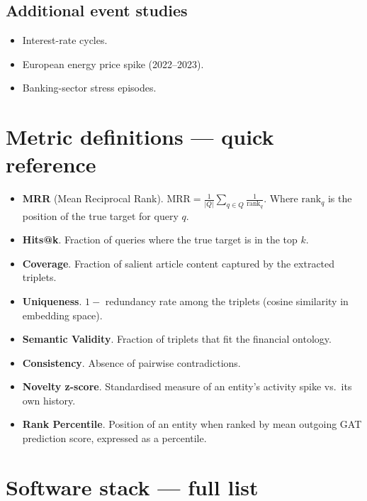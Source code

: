 \documentclass[11pt]{article}
\begin{document}
\subsection{Additional event studies}
\begin{itemize}
  \item Interest-rate cycles.
  \item European energy price spike (2022--2023).
  \item Banking-sector stress episodes.
\end{itemize}

\appendix

\section{Metric definitions --- quick reference}

\begin{itemize}
  \item \textbf{MRR} (Mean Reciprocal Rank). \(\text{MRR} = \frac{1}{|Q|} \sum_{q \in Q} \frac{1}{\text{rank}_q}\). Where \(\text{rank}_q\) is the position of the true target for query \(q\).
  \item \textbf{Hits@k}. Fraction of queries where the true target is in the top \(k\).
  \item \textbf{Coverage}. Fraction of salient article content captured by the extracted triplets.
  \item \textbf{Uniqueness}. \(1 -\) redundancy rate among the triplets (cosine similarity in embedding space).
  \item \textbf{Semantic Validity}. Fraction of triplets that fit the financial ontology.
  \item \textbf{Consistency}. Absence of pairwise contradictions.
  \item \textbf{Novelty z-score}. Standardised measure of an entity's activity spike vs.\ its own history.
  \item \textbf{Rank Percentile}. Position of an entity when ranked by mean outgoing GAT prediction score, expressed as a percentile.
\end{itemize}

\section{Software stack --- full list}
\end{document}
